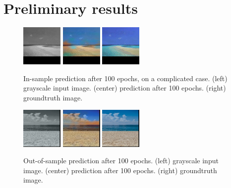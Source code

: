 \documentclass[10pt,twocolumn,letterpaper]{article}
\begin{document}
\section{Preliminary results}


\begin{figure}
\includegraphics[width=75px]{img/grayscaleis.png}
\includegraphics[width=75px]{img/100epochis.png}
\includegraphics[width=75px]{img/grndtruthis.png}
\caption{In-sample prediction after 100 epochs, on a complicated case. (left) grayscale input image. (center) prediction after 100 epochs. (right) groundtruth image.}
\label{is}
\end{figure}

\begin{figure}
\includegraphics[width=75px]{img/grayscaleoos.png}
\includegraphics[width=75px]{img/100epochoos.png}
\includegraphics[width=75px]{img/grndtruthoos.png}
\caption{Out-of-sample prediction after 100 epochs. (left) grayscale input image. (center) prediction after 100 epochs. (right) groundtruth image.}
\label{oos}
\end{figure}
\end{document}
